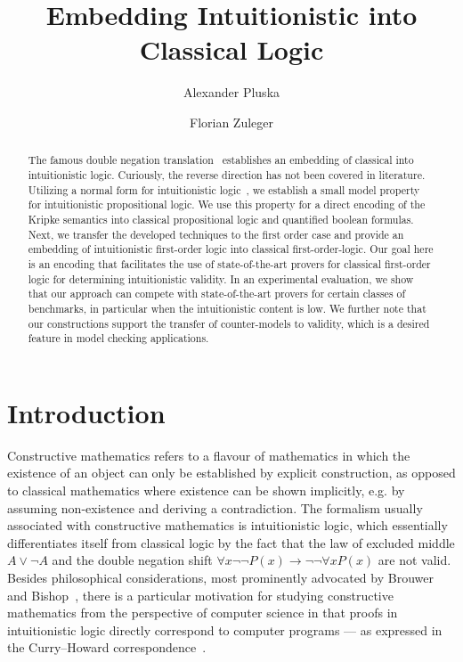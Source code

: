 \documentclass[runningheads]{llncs}
\begin{document}
	\title{Embedding Intuitionistic into Classical Logic}
	\author{Alexander Pluska \and Florian Zuleger}
	\maketitle
\begin{abstract}
The famous double negation translation~\cite{glivenko1929quelques,godel1933intuitionistischen} establishes an embedding of classical into intuitionistic logic.
Curiously, the reverse direction has not been covered in literature.
Utilizing a normal form for intuitionistic logic~\cite{claessen2015sat}, we establish a small model property for intuitionistic propositional logic.
We use this property for a direct encoding of the Kripke semantics into classical propositional logic and quantified boolean formulas.
Next, we transfer the developed techniques to the first order case and provide an embedding of intuitionistic first-order logic into classical first-order-logic.
Our goal here is an encoding that facilitates the use of state-of-the-art provers for classical first-order logic for determining intuitionistic validity.
In an experimental evaluation, we show that our approach can compete with state-of-the-art provers for certain classes of benchmarks, in particular when the intuitionistic content is low.
We further note that our constructions support the transfer of counter-models to validity, which is a desired feature in model checking applications.
\end{abstract}

\section{Introduction}

Constructive mathematics refers to a flavour of mathematics in which the existence of an object can only be established by explicit construction, as opposed to classical mathematics where existence can be shown implicitly, e.g. by assuming non-existence and deriving a contradiction.
The formalism usually associated with constructive mathematics is intuitionistic logic, which essentially differentiates itself from classical logic by the fact that the law of excluded middle $A\vee\neg A$ and the double negation shift $\forall x\neg\neg P(x)\to\neg\neg\forall xP(x)$ are not valid.
Besides philosophical considerations, most prominently advocated by Brouwer~\cite{brouwer1907over} and Bishop~\cite{bishop1967foundations}, there is a particular motivation for studying constructive mathematics from the perspective of computer science in that proofs in intuitionistic logic directly correspond to computer programs --- as expressed in the Curry--Howard correspondence~\cite{howard1980formulae}.
\end{document}
